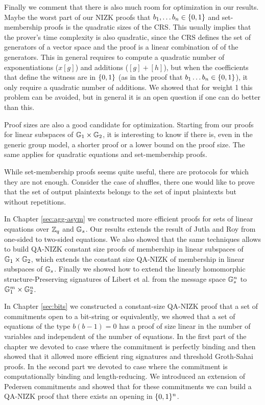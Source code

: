 Finally we comment that there is also much room for optimization in our results. Maybe the worst part of our NIZK proofs that $b_1,\ldots b_n\in\{0,1\}$ and set-membership proofs is the quadratic sizes of the CRS. This usually implies that the prover's time complexity is also quadratic, since the CRS defines the set of generators of a vector space and the proof is a linear combination of of the generators. This in general requires to compute a quadratic number of exponentiations ($x[g]$)  and additions ($[g]+[h]$), but when the coefficients that define the witness are in $\{0,1\}$ (as in the proof that $b_1\ldots b_n\in\{0,1\}$), it only require a quadratic number of additions. We showed that for weight 1 this problem can be avoided, but in general it is an open question if one can do better than this.

Proof sizes are also a good candidate for optimization. Starting from our proofs for linear subspaces of $\mathbb{G}_1\times\mathbb{G}_2$, it is interesting to know if there is, even in the generic group model, a shorter proof or a lower bound on the proof size. The same applies for quadratic equations and set-membership proofs.

\iffalse
While set-membership proofs seems quite useful, there are protocols for which they are not enough. Consider the case of shuffles, there one would like to prove that the set of output plaintexts belongs to the set of input plaintexts but without repetitions. 


In Chapter \ref{sec:agg-asym} we constructed more efficient proofs for sets of linear equations over $\mathbb{Z}_q$ and $\mathbb{G}_s$. Our results extends the result of Jutla and Roy \cite{C:JutRoy14} from one-sided to two-sided equations. We also showed that the same techniques allows to build QA-NIZK constant size proofs of membership in linear subspaces of $\mathbb{G}_1\times\mathbb{G}_2$, which extends the constant size QA-NIZK of membership in linear subspaces of $\mathbb{G}_s$. Finally we showed how to extend the linearly homomorphic structure-Preserving signatures of Libert et al. \cite{EC:LPJY14} from the message space $\mathbb{G}_s^n$ to $\mathbb{G}_1^m\times\mathbb{G}_2^n$.

In Chapter \ref{sec:bits} we constructed a constant-size QA-NIZK proof that a set of commitments open to a bit-string or equivalently, we showed that a set of equations of the type $b(b-1)=0$ has a proof of size linear in the number of variables and independent of the number of equations. In the first part of the chapter we devoted to case where the commitment is perfectly binding and then showed that it allowed more efficient ring signatures and threshold Groth-Sahai proofs. In the second part we devoted to case where the commitment is computationally binding and length-reducing. We introduced an extension of Pedersen commitments and showed that for these commitments we can build a QA-NIZK proof that there exists an opening in $\{0,1\}^n$.

